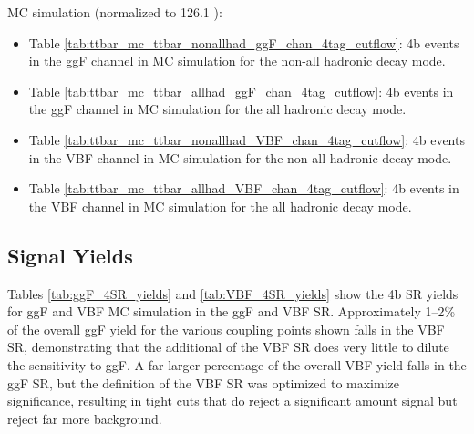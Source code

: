 \ttbar MC simulation (normalized to 126.1 \ifb):

\begin{itemize}
	\item Table \ref{tab:ttbar_mc_ttbar_nonallhad_ggF_chan_4tag_cutflow}: 4b events in the ggF channel in \ttbar MC simulation for the non-all hadronic decay mode.
	\item Table \ref{tab:ttbar_mc_ttbar_allhad_ggF_chan_4tag_cutflow}: 4b events in the ggF channel in \ttbar MC simulation for the all hadronic decay mode.
	\item Table \ref{tab:ttbar_mc_ttbar_nonallhad_VBF_chan_4tag_cutflow}: 4b events in the VBF channel in \ttbar MC simulation for the non-all hadronic decay mode.
	\item Table \ref{tab:ttbar_mc_ttbar_allhad_VBF_chan_4tag_cutflow}: 4b events in the VBF channel in \ttbar MC simulation for the all hadronic decay mode.
\end{itemize}

\def\tablesversion{V2}










\clearpage

\subsection{Signal Yields}
\label{subsec:sigYields}

Tables \ref{tab:ggF_4SR_yields} and \ref{tab:VBF_4SR_yields} show the 4b SR yields for ggF and VBF \HH MC simulation in the ggF and VBF SR. Approximately 1--2\% of the overall ggF yield for the various coupling points shown falls in the VBF SR, demonstrating that the additional of the VBF SR does very little to dilute the sensitivity to ggF. A far larger percentage of the overall VBF yield falls in the ggF SR, but the definition of the VBF SR was optimized to maximize significance, resulting in tight cuts that do reject a significant amount signal but reject far more background.


